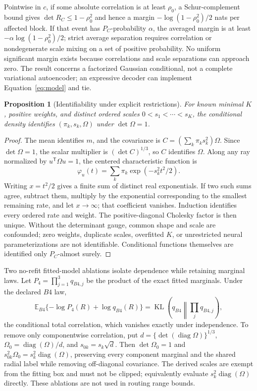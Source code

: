 \documentclass[11pt]{article}
\newtheorem{proposition}{Proposition}[section]
\DeclareMathOperator{\KL}{KL}
\newcommand{\E}{\mathbb E}
\begin{document}
Pointwise in $c$, if some absolute correlation is at least $\rho_0$, a Schur-complement bound gives $\det R_C\le1-\rho_0^2$ and hence a margin $-\log(1-\rho_0^2)/2$ nats per affected block.  If that event has $P_C$-probability $\alpha$, the averaged margin is at least $-\alpha\log(1-\rho_0^2)/2$; strict average separation requires correlation or nondegenerate scale mixing on a set of positive probability.  No uniform significant margin exists because correlations and scale separations can approach zero.  The result concerns a factorized Gaussian conditional, not a complete variational autoencoder; an expressive decoder can implement Equation~\eqref{eq:model} and tie.

\begin{proposition}[Identifiability under explicit restrictions]
For known minimal $K$, positive weights, and distinct ordered scales $0<s_1<\cdots<s_K$, the conditional density identifies $(\pi_k,s_k,\Omega)$ under $\det\Omega=1$.
\end{proposition}

\begin{proof}
The mean identifies $m$, and the covariance is $C=(\sum_k\pi_ks_k^2)\Omega$.  Since $\det\Omega=1$, the scalar multiplier is $(\det C)^{1/3}$, so $C$ identifies $\Omega$.  Along any ray normalized by $u^{\mathsf T}\Omega u=1$, the centered characteristic function is
\[
 \varphi_u(t)=\sum_k\pi_k\exp(-s_k^2t^2/2).
\]
Writing $x=t^2/2$ gives a finite sum of distinct real exponentials.  If two such sums agree, subtract them, multiply by the exponential corresponding to the smallest remaining rate, and let $x\to\infty$; that coefficient vanishes.  Induction identifies every ordered rate and weight.  The positive-diagonal Cholesky factor is then unique.  Without the determinant gauge, common shape and scale are confounded; zero weights, duplicate scales, overfitted $K$, or unrestricted neural parameterizations are not identifiable.  Conditional functions themselves are identified only $P_C$-almost surely.
\end{proof}

Two no-refit fitted-model ablations isolate dependence while retaining marginal laws.  Let $P_4=\prod_{j=1}^3q_{B4,j}$ be the product of the exact fitted marginals.  Under the declared $B4$ law,
\[
 \E_{B4}\{-\log P_4(R)+\log q_{B4}(R)\}
 =\KL\!\left(q_{B4}\middle\|\prod_jq_{B4,j}\right),
\]
the conditional total correlation, which vanishes exactly under independence.  To remove only componentwise correlation, put $d=\{\det(\operatorname{diag}\Omega)\}^{1/3}$, $\Omega_0=\operatorname{diag}(\Omega)/d$, and $s_{0k}=s_k\sqrt d$.  Then $\det\Omega_0=1$ and $s_{0k}^2\Omega_0=s_k^2\operatorname{diag}(\Omega)$, preserving every component marginal and the shared radial label while removing off-diagonal covariance.  The derived scales are exempt from the fitting box and must not be clipped; equivalently evaluate $s_k^2\operatorname{diag}(\Omega)$ directly.  These ablations are not used in routing range bounds.
\end{document}
